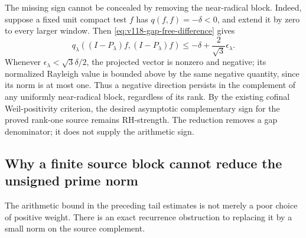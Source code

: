 \documentclass[11pt]{article}
\theoremstyle{remark}
\begin{document}
The missing sign cannot be concealed by removing the near-radical
block.  Indeed, suppose a fixed unit compact test $f$ has
$q(f,f)=-\delta<0$, and extend it by zero to every larger window.
Then \eqref{eq:v118-gap-free-difference} gives
\[
 q_\lambda((I-P_\lambda)f,(I-P_\lambda)f)
 \le-\delta+\frac{2}{\sqrt3}\epsilon_\lambda.
\]
Whenever $\epsilon_\lambda<\sqrt3\delta/2$, the projected vector
is nonzero and negative; its normalized Rayleigh value is bounded
above by the same negative quantity, since its norm is at most one.
Thus a negative direction persists in the complement of any uniformly
near-radical block, regardless of its rank.  By the existing cofinal
Weil-positivity criterion, the desired asymptotic complementary sign
for the proved rank-one source remains RH-strength.  The reduction
removes a gap denominator; it does not supply the arithmetic sign.

\subsection*{Why a finite source block cannot reduce the unsigned prime norm}

The arithmetic bound in the preceding tail estimates is not merely a
poor choice of positive weight.  There is an exact recurrence obstruction
to replacing it by a small norm on the source complement.
\end{document}
